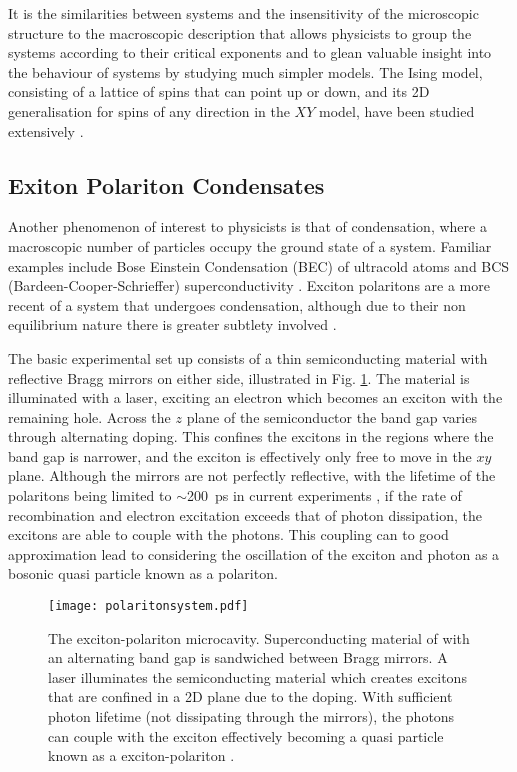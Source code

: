\documentclass[letterpaper, 10 pt, conference]{IEEEtran}  %
\newcommand{\fig}[1]{Fig. #1}
\begin{document}
It is the similarities between systems and the insensitivity of the microscopic structure to the  macroscopic description that allows physicists to group the systems according to their critical exponents and to glean valuable insight into the behaviour of systems by studying much simpler models.
The Ising model, consisting of a lattice of spins that can point up or down, and its 2D generalisation for spins of any direction in the $XY$ model, have been studied extensively \cite{Gallavotti1972, 2005cond.mat.12356K}.  
 
\subsection{Exiton Polariton Condensates}

Another phenomenon of interest to physicists is that of condensation, where a macroscopic number of particles occupy the ground state of a system. 
Familiar examples include Bose Einstein Condensation (BEC) of ultracold atoms \cite{1674-1056-24-5-050507} and BCS (Bardeen-Cooper-Schrieffer) superconductivity \cite{PhysRev.108.1175}.
Exciton polaritons are a more recent of a system that undergoes condensation, although due to their non equilibrium nature there is greater subtlety involved \cite{Byrnes2014}.  

The basic experimental set up consists of a thin semiconducting material with reflective Bragg mirrors on either side, illustrated in \fig{\ref{fig:exciton-polariton}}.  
The material is illuminated with a laser, exciting an electron which becomes an exciton with the remaining hole. 
Across the $z$ plane of the semiconductor the band gap varies through alternating doping. 
This confines the excitons in the regions where the band gap is narrower, and the exciton is effectively only free to move in the $xy$ plane.
Although the mirrors are not perfectly reflective, with the lifetime of the polaritons being limited to $\sim$\SI{200}{\pico\second} in current experiments \cite{ 2014arXiv1408.1680S}, if the rate of recombination and electron excitation exceeds that of photon dissipation, the excitons are able to couple with the photons\cite{doi:10.1080/00107514.2010.550120}. 
This coupling can to good approximation lead to considering the oscillation of the exciton and photon as a bosonic quasi particle known as a polariton.    

\begin{figure}[htbp!]
	\centering
	\texttt{[image: polaritonsystem.pdf]}
	\caption{The exciton-polariton microcavity.
	Superconducting material of with an alternating band gap is sandwiched between Bragg mirrors. 
	A laser illuminates the semiconducting material which creates excitons that are confined in a 2D plane due to the doping. 
	With sufficient photon lifetime (not dissipating through the mirrors), the photons can couple with the exciton effectively becoming a quasi particle known as a exciton-polariton \cite{Byrnes2014}.}
	\label{fig:exciton-polariton}
\end{figure}
\end{document}
